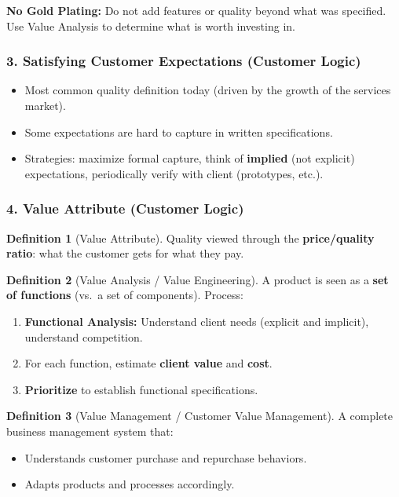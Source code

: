 \documentclass[11pt,a4paper]{article}
\theoremstyle{definition}
\newtheorem{definition}{Definition}[section]
\theoremstyle{plain}
\begin{document}
\begin{warning}
\textbf{No Gold Plating:} Do not add features or quality beyond what was specified. Use Value Analysis to determine what is worth investing in.
\end{warning}

\subsubsection{3. Satisfying Customer Expectations (Customer Logic)}

\begin{itemize}[nosep]
  \item Most common quality definition today (driven by the growth of the services market).
  \item Some expectations are hard to capture in written specifications.
  \item Strategies: maximize formal capture, think of \textbf{implied} (not explicit) expectations, periodically verify with client (prototypes, etc.).
\end{itemize}

\subsubsection{4. Value Attribute (Customer Logic)}

\begin{definition}[Value Attribute]
Quality viewed through the \textbf{price/quality ratio}: what the customer gets for what they pay.
\end{definition}

\begin{definition}[Value Analysis / Value Engineering]
A product is seen as a \textbf{set of functions} (vs.\ a set of components). Process:
\begin{enumerate}[nosep, label=\arabic*.]
  \item \textbf{Functional Analysis:} Understand client needs (explicit and implicit), understand competition.
  \item For each function, estimate \textbf{client value} and \textbf{cost}.
  \item \textbf{Prioritize} to establish functional specifications.
\end{enumerate}
\end{definition}

\begin{definition}[Value Management / Customer Value Management]
A complete business management system that:
\begin{itemize}[nosep]
  \item Understands customer purchase and repurchase behaviors.
  \item Adapts products and processes accordingly.
\end{itemize}
\end{definition}
\end{document}
